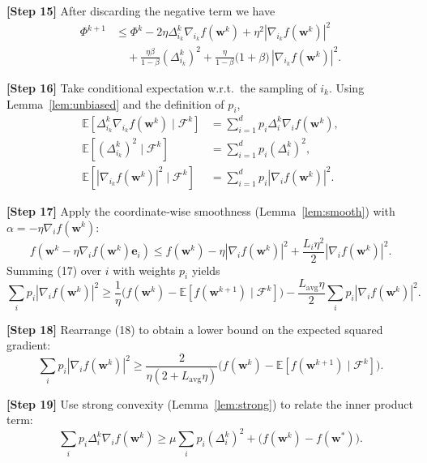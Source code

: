\documentclass{article}
\newcommand{\E}{\mathbb{E}}
\begin{document}
\medskip
\noindent\textbf{[Step 15]} After discarding the negative term we have
\[
\begin{aligned}
\Phi^{k+1}
&\le \Phi^{k}
   -2\eta\Delta^{k}_{i_k}\nabla_{i_k} f(\mathbf w^{k})
   +\eta^{2}|\nabla_{i_k} f(\mathbf w^{k})|^{2} \\
&\quad +\frac{\eta\beta}{1-\beta}(\Delta^{k}_{i_k})^{2}
   +\frac{\eta}{1-\beta}\bigl(1+\beta\bigr)\,|\nabla_{i_k} f(\mathbf w^{k})|^{2}.
\end{aligned}
\tag{15}
\]

\medskip
\noindent\textbf{[Step 16]} Take conditional expectation w.r.t.\ the sampling of $i_k$.
Using Lemma~\ref{lem:unbiased} and the definition of $p_i$,
\[
\begin{aligned}
\E\!\left[\Delta^{k}_{i_k}\nabla_{i_k} f(\mathbf w^{k})\mid\mathcal F^{k}\right]
   &=\sum_{i=1}^{d}p_i \Delta^{k}_{i}\nabla_i f(\mathbf w^{k}),\\
\E\!\left[(\Delta^{k}_{i_k})^{2}\mid\mathcal F^{k}\right]
   &=\sum_{i=1}^{d}p_i (\Delta^{k}_{i})^{2},\\
\E\!\left[|\nabla_{i_k} f(\mathbf w^{k})|^{2}\mid\mathcal F^{k}\right]
   &=\sum_{i=1}^{d}p_i |\nabla_i f(\mathbf w^{k})|^{2}.
\end{aligned}
\tag{16}
\]

\medskip
\noindent\textbf{[Step 17]} Apply the coordinate‑wise smoothness (Lemma~\ref{lem:smooth}) with $\alpha=-\eta \nabla_i f(\mathbf w^{k})$:
\[
f(\mathbf w^{k}-\eta\nabla_i f(\mathbf w^{k})\mathbf e_i)
\le f(\mathbf w^{k})-\eta |\nabla_i f(\mathbf w^{k})|^{2}
   +\frac{L_i\eta^{2}}{2}|\nabla_i f(\mathbf w^{k})|^{2}.
\tag{17}
\]
Summing (17) over $i$ with weights $p_i$ yields
\[
\sum_{i}p_i |\nabla_i f(\mathbf w^{k})|^{2}
\ge \frac{1}{\eta}\bigl(f(\mathbf w^{k})- \E[f(\mathbf w^{k+1})\mid\mathcal F^{k}]\bigr)
    -\frac{L_{\mathrm{avg}}\eta}{2}\sum_{i}p_i |\nabla_i f(\mathbf w^{k})|^{2}.
\tag{18}
\]

\medskip
\noindent\textbf{[Step 18]} Rearrange (18) to obtain a lower bound on the expected squared gradient:
\[
\sum_{i}p_i |\nabla_i f(\mathbf w^{k})|^{2}
\ge \frac{2}{\eta(2+L_{\mathrm{avg}}\eta)}
      \bigl(f(\mathbf w^{k})- \E[f(\mathbf w^{k+1})\mid\mathcal F^{k}]\bigr).
\tag{19}
\]

\medskip
\noindent\textbf{[Step 19]} Use strong convexity (Lemma~\ref{lem:strong}) to relate the inner product term:
\[
\sum_{i}p_i \Delta^{k}_{i}\nabla_i f(\mathbf w^{k})
\ge \mu \sum_{i}p_i (\Delta^{k}_{i})^{2}
    +\bigl(f(\mathbf w^{k})-f(\mathbf w^{*})\bigr).
\tag{20}
\]
\end{document}
